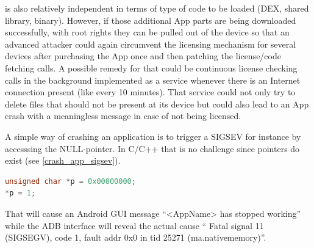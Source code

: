 is also relatively independent in terms of type of code to be loaded (DEX,
shared library, binary). However, if those additional App parts are being
downloaded successfully, with root rights they can be pulled out of the
device so that an advanced attacker could again circumvent the licensing
mechanism for several devices after purchasing the App once and then patching
the license/code fetching calls. 
A possible remedy for that could be continuous license checking calls in the
background implemented as a service whenever there is an Internet connection
present (like every 10 minutes). That service could not only try to delete
files that should not be present at its device but could also lead to an 
App crash with a meaningless message in case of not being licensed. 

A simple way of crashing an application is to trigger a SIGSEV for instance
by accesssing the NULL-pointer. In C/C++ that is no challenge since pointers
do exist (see \autoref{crash_app_sigsev}).  
\begin{lstlisting}[language=C++, caption=crashApp(), label=crash_app_sigsev]
unsigned char *p = 0x00000000;
*p = 1;
\end{lstlisting}
That will cause an Android GUI message ``<AppName> has stopped working'' while
the ADB interface will reveal the actual cause `` Fatal signal 11 (SIGSEGV), code 1, fault addr 0x0 in tid 25271 (ma.nativememory)''.
